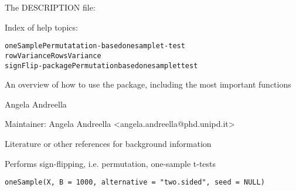\documentclass[a4paper]{book}
\begin{document}
\begin{Details}\relax

The DESCRIPTION file:


Index of help topics:
\begin{alltt}
oneSample               Permutatation-based one sample t-test
rowVariance             Rows Variance
signFlip-package        Permutation based one sample t test
\end{alltt}

An overview of how to use the package, including the most important functions
\end{Details}
%
\begin{Author}\relax
Angela Andreella

Maintainer: Angela Andreella <angela.andreella@phd.unipd.it>
\end{Author}
%
\begin{References}\relax
Literature or other references for background information
\end{References}
%
\begin{Description}\relax
Performs sign-flipping, i.e. permutation, one-sample t-tests
\end{Description}
%
\begin{Usage}
\begin{verbatim}
oneSample(X, B = 1000, alternative = "two.sided", seed = NULL)
\end{verbatim}
\end{Usage}
%
\end{document}
